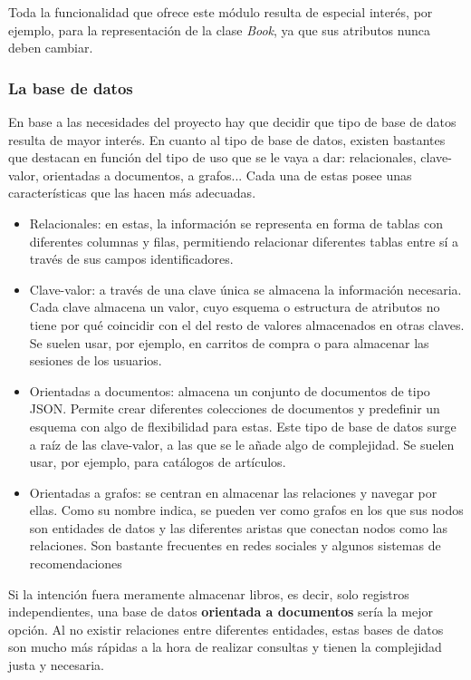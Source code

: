 Toda la funcionalidad que ofrece este módulo resulta de especial interés, por ejemplo, para la representación de la clase \textit{Book}, ya que sus atributos nunca deben cambiar.

\subsubsection{La base de datos}

En base a las necesidades del proyecto hay que decidir que tipo de base de datos resulta de mayor interés. En cuanto al tipo de base de datos, existen bastantes que destacan en función del tipo de uso que se le vaya a dar: relacionales, clave-valor, orientadas a documentos, a grafos... Cada una de estas posee unas características que las hacen más adecuadas.

\begin{itemize}
    \item Relacionales: en estas, la información se representa en forma de tablas con diferentes columnas y filas, permitiendo relacionar diferentes tablas entre sí a través de sus campos identificadores.
    \item Clave-valor: a través de una clave única se almacena la información necesaria. Cada clave almacena un valor, cuyo esquema o estructura de atributos no tiene por qué coincidir con el del resto de valores almacenados en otras claves. Se suelen usar, por ejemplo, en carritos de compra o para almacenar las sesiones de los usuarios.
    \item Orientadas a documentos: almacena un conjunto de documentos de tipo JSON. Permite crear diferentes colecciones de documentos y predefinir un esquema con algo de flexibilidad para estas. Este tipo de base de datos surge a raíz de las clave-valor, a las que se le añade algo de complejidad. Se suelen usar, por ejemplo, para catálogos de artículos.
    \item Orientadas a grafos: se centran en almacenar las relaciones y navegar por ellas. Como su nombre indica, se pueden ver como grafos en los que sus nodos son entidades de datos y las diferentes aristas que conectan nodos como las relaciones. Son bastante frecuentes en redes sociales y algunos sistemas de recomendaciones
\end{itemize}

Si la intención fuera meramente almacenar libros, es decir, solo registros independientes, una base de datos \textbf{orientada a documentos} sería la mejor opción. Al no existir relaciones entre diferentes entidades, estas bases de datos son mucho más rápidas a la hora de realizar consultas y tienen la complejidad justa y necesaria.

